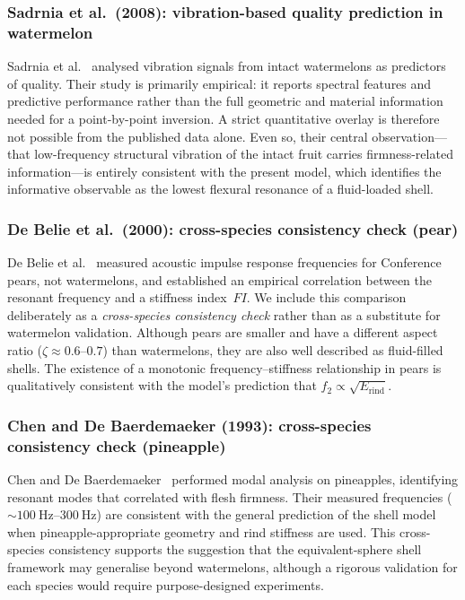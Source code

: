 \subsubsection{Sadrnia et al.\ (2008): vibration-based quality prediction in watermelon}

Sadrnia et al.~\cite{Sadrnia2008Vibration} analysed vibration signals
from intact watermelons as predictors of quality.  Their study is
primarily empirical: it reports spectral features and predictive
performance rather than the full geometric and material information
needed for a point-by-point inversion.  A strict quantitative overlay is
therefore not possible from the published data alone.  Even so, their
central observation---that low-frequency structural vibration of the
intact fruit carries firmness-related information---is entirely consistent with
the present model, which identifies the informative observable as the
lowest flexural resonance of a fluid-loaded shell.

\subsubsection{De Belie et al.\ (2000): cross-species consistency check (pear)}

De Belie et al.~\cite{DeBelieetal2000} measured acoustic impulse
response frequencies for Conference pears, not watermelons, and
established an empirical correlation between the resonant frequency and
a stiffness index~$FI$.  We include this comparison deliberately as a
\emph{cross-species consistency check} rather than as a substitute for watermelon
validation.
Although pears are smaller and have a different aspect ratio ($\zeta
\approx 0.6$--$0.7$) than watermelons, they are also well described as
fluid-filled shells.  The existence of a monotonic frequency--stiffness
relationship in pears is qualitatively consistent with the model's
prediction that $f_2 \propto \sqrt{E_{\mathrm{rind}}}$.

\subsubsection{Chen and De Baerdemaeker (1993): cross-species consistency check (pineapple)}

Chen and De Baerdemaeker~\cite{ChenDeBaerdemaeker1993} performed modal
analysis on pineapples, identifying resonant modes that correlated with
flesh firmness.  Their measured frequencies
($\sim\SIrange{100}{300}{\hertz}$) are consistent with the general
prediction of the shell model when pineapple-appropriate geometry and
rind stiffness are used.  This cross-species consistency supports the
suggestion that the equivalent-sphere shell framework may generalise beyond
watermelons, although a rigorous validation for each species would
require purpose-designed experiments.

